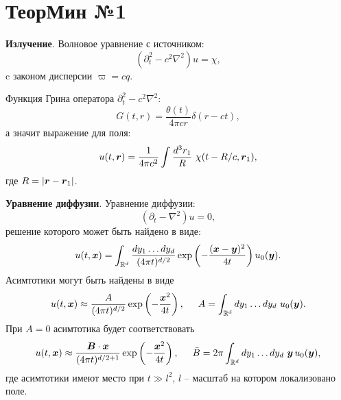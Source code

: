 \section*{ТеорМин №1}

\textbf{Излучение}. Волновое уравнение с источником:
\begin{equation}
    (\partial_t^2 - c^2 \nabla^2) u = \chi,
    \label{field_eq}
\end{equation}
c законом дисперсии $\varpi = cq$. 

Функция Грина оператора $\partial_t^2 - c^2 \nabla^2$:
\begin{equation*}
    G(t, r) = \frac{\theta(t)}{4 \pi c r} \delta(r - ct),
\end{equation*}
а значит выражение для поля:
\begin{equation}
    u(t, \mbox{\boldmath $r$}) = \frac{1}{4 \pi c^2} \int \frac{d^3 r_1}{R} \ \chi(t-R/c, \mbox{\boldmath $r$}_1),
    \label{field_sol}
\end{equation}
где $R = |\mbox{\boldmath $r$} - \mbox{\boldmath $r$}_1|$. 


\textbf{Уравнение диффузии}. 
Уравнение диффузии:
\begin{equation}
    \left(\partial_t - \nabla^2\right) u = 0,
    \label{difeq}
\end{equation}
решение которого может быть найдено в виде:
\begin{equation}
    u(t, \mbox{\boldmath $x$}) = \int_{\mathbb{R}^d} \frac{d y_1 \ldots d y_d}{(4 \pi t)^{d/2}} \exp\left(- \frac{(\mbox{\boldmath $x$}-\mbox{\boldmath $y$})^2}{4 t}\right) u_0(\mbox{\boldmath $y$}).
    \label{difsol}
\end{equation}
Асимтотики могут быть найдены в виде
\begin{equation}
    u(t, \mbox{\boldmath $x$}) \approx \frac{A}{(4 \pi t)^{d/2}} \exp\left(- \frac{\mbox{\boldmath $x$}^2}{4 t}\right),
    \hspace{5 mm} 
    A = \int_{ \mathbb{R}^d} dy_1 \ldots dy_d \ u_0(\mbox{\boldmath $y$}).
    \label{difas1}
\end{equation}
При $A = 0$ асимтотика будет соответствовать
\begin{equation}
    u(t, \mbox{\boldmath $x$}) \approx  \frac{\mbox{\boldmath $B$} \cdot \mbox{\boldmath $x$}}{(4 \pi t)^{d/2+1}} \exp\left(
        - \frac{\mbox{\boldmath $x$}^2}{4 t}
    \right), \hspace{5 mm} 
    \bar{B} = 2 \pi \int_{ \mathbb{R}^d} dy_1 \ldots dy_d \ \mbox{\boldmath $y$}\, u_0(\mbox{\boldmath $y$}),
    \label{difas2}
\end{equation}
где асимтотики имеют место при $t \gg l^2$, $l$ -- масштаб на котором локализовано поле.


